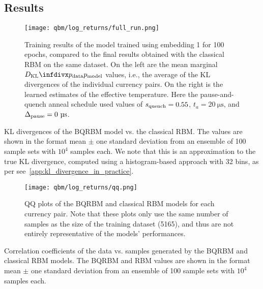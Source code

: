 \subsection{Results}
\begin{figure}[!htb]
    \begin{center}
        \texttt{[image: qbm/log\_returns/full\_run.png]}
    \end{center}
    \caption{
        Training results of the model trained using embedding 1 for 100 epochs, compared to the final results obtained with the classical RBM on the same dataset.
        On the left are the mean marginal \( \DKL{\pdata}{\pmodel} \) values, i.e., the average of the KL divergences of the individual currency pairs.
        On the right is the learned estimates of the effective temperature.
        Here the pause-and-quench anneal schedule used values of \( s_{\text{quench}} = 0.55 \), \( t_a = 20 \ \si{\micro\second} \), and \( \Deltapause = 0 \ \si{\micro\second} \).
    }
    \label{fig:qbm_log_returns_full_run}
\end{figure}

\begin{table}[!htb]
    \centering
    \begin{adjustbox}{max width=\textwidth}
        
    \end{adjustbox}
    \caption{
        KL divergences of the BQRBM model vs. the classical RBM.
        The values are shown in the format mean \(\pm\) one standard deviation from an ensemble of 100 sample sets with \( 10^4 \) samples each.
        We note that this is an approximation to the true KL divergence, computed using a histogram-based approach with 32 bins, as per see~\cref{app:kl_divergence_in_practice}.
}
    \label{tbl:qbm_KL_divergences}
\end{table}

\begin{figure}[!htb]
    \begin{center}
        \texttt{[image: qbm/log\_returns/qq.png]}
    \end{center}
    \caption{QQ plots of the BQRBM and classical RBM models for each currency pair. Note that these plots only use the same number of samples as the size of the training dataset (5165), and thus are not entirely representative of the models' performances.}
    \label{fig:qbm_log_returns_qq}
\end{figure}

\begin{table}[!htb]
    \centering
    \begin{adjustbox}{max width=\textwidth}
        
    \end{adjustbox}
    \caption{Correlation coefficients of the data vs. samples generated by the BQRBM and classical RBM models. The BQRBM and RBM values are shown in the format mean \(\pm\) one standard deviation from an ensemble of 100 sample sets with \( 10^4 \) samples each.}
    \label{tbl:qbm_correlation_coefficients}
\end{table}

